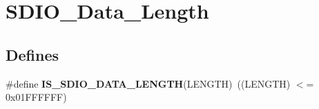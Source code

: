 \hypertarget{group__SDIO__Data__Length}{
\section{SDIO\_\-Data\_\-Length}
\label{group__SDIO__Data__Length}
}
\subsection*{Defines}
\begin{DoxyCompactItemize}
\item 
\hypertarget{group__SDIO__Data__Length_ga57dd64db3f69d18625ea8ca82c009fad}{
\#define {\bfseries IS\_\-SDIO\_\-DATA\_\-LENGTH}(LENGTH)~((LENGTH) $<$= 0x01FFFFFF)}
\label{group__SDIO__Data__Length_ga57dd64db3f69d18625ea8ca82c009fad}

\end{DoxyCompactItemize}
